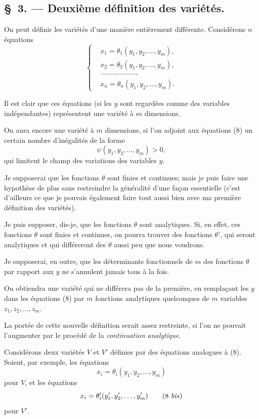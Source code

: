 \documentclass{article}
\begin{document}
\subsection*{\S~3. --- Deuxième définition des variétés.}

On peut définir les variétés d'une manière entièrement différente. Considérons $n$ équations
\[
\left\{
\begin{aligned}
&x_{1} = \theta_{1}(y_{1}, y_{2}, \ldots, y_{m}),\\
&x_{2} = \theta_{2}(y_{1}, y_{2}, \ldots, y_{m}),\\
&\ldots\ldots\ldots\ldots\ldots\ldots,\\
&x_{n} = \theta_{n}(y_{1}, y_{2}, \ldots, y_{m}).
\end{aligned}
\right.
\tag{8}
\]

Il est clair que ces équations (si les $y$ sont regardées comme des variables indépendantes) représentent une variété à $m$ dimensions.

On aura encore une variété à $m$ dimensions, si l'on adjoint aux équations (8) un certain nombre d'inégalités de la forme
\[
\psi(y_{1}, y_{2}, \ldots, y_{m}) > 0,
\]
qui limitent le champ des variations des variables $y$.

Je supposerai que les fonctions $\theta$ sont finies et continues; mais je puis faire une hypothèse de plus sans restreindre la généralité d'une façon essentielle (c'est d'ailleurs ce que je pouvais également faire tout aussi bien avec ma première définition des variétés).

Je puis supposer, dis-je, que les fonctions $\theta$ sont analytiques. Si, en effet, ces fonctions $\theta$ sont finies et continues, on pourra trouver des fonctions $\theta'$, qui seront analytiques et qui différeront des $\theta$ aussi peu que nous voudrons.

Je supposerai, en outre, que les déterminants fonctionnels de $m$ des fonctions $\theta$ par rapport aux $y$ ne s'annulent jamais tous à la fois.

On obtiendra une variété qui ne différera pas de la première, en remplaçant les $y$ dans les équations (8) par $m$ fonctions analytiques quelconques de $m$ variables $z_{1}, z_{2}, \ldots, z_{m}$.

La portée de cette nouvelle définition serait assez restreinte, si l'on ne pouvait l'augmenter par le procédé de la \emph{continuation analytique}.

Considérons deux variétés $V$ et $V'$ définies par des équations analogues à (8). Soient, par exemple, les équations
\[
x_{i} = \theta_{i}(y_{1}, y_{2}, \ldots, y_{m})
\tag{8}
\]
pour $V$, et les équations
\[
x_{i} = \theta'_{i}(y'_{1}, y'_{2}, \ldots, y'_{m})
\tag{8 \textit{bis}}
\]
pour $V'$.
\end{document}
